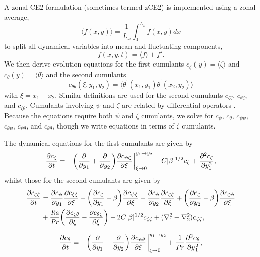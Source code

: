 \documentclass{jfm}
\newcommand{\cz}{c_{\zeta}}
\newcommand{\cs}{c_{\psi}}
\newcommand{\ct}{c_{\theta}}
\newcommand{\css}{c_{\psi \psi}}
\newcommand{\csz}{c_{\psi \zeta}}
\newcommand{\czs}{c_{\zeta \psi}}
\newcommand{\czz}{c_{\zeta \zeta}}
\newcommand{\ctz}{c_{\theta \zeta}}
\newcommand{\czt}{c_{\zeta \theta}}
\newcommand{\ctt}{c_{\theta \theta}}
\newcommand{\cst}{c_{\psi \theta}}
\newcommand{\cts}{c_{\theta \psi}}
\newcommand{\Rayleigh}{\mbox{\textit{Ra}}}  %
\begin{document}
A zonal CE2 formulation (sometimes termed zCE2) is implemented using a zonal average, 
\begin{equation}
\langle f(x,y) \rangle = \frac{1}{L_x} \int_0^{L_x} f(x,y) dx
\end{equation}
to split all dynamical variables into mean and fluctuating components,
\begin{equation}
    f(x,y,t) = \langle f \rangle + f'.
\end{equation}
We then derive evolution equations for the first cumulants $\cz(y) = \langle \zeta \rangle $ and $\ct(y) = \langle \theta \rangle$ and the second cumulants 
\begin{equation}
    \ctt(\xi,y_1,y_2) = \langle \theta^\prime(x_1,y_1) \theta^\prime(x_2,y_2) \rangle
\end{equation}
with $\xi = x_1 - x_2$.
Similar definitions are used for the second cumulants $\czz$, $\ctz$, and $\czt$. 
Cumulants involving $\psi$ and $\zeta$ are related by differential operators \citep{2013PhRvL.110j4502T}.
Because the equations require both $\psi$ and $\zeta$ cumulants, we solve for $\cs$, $\ct$, $\css$, $\cts$, $\cst$, and $\ctt$, though we write equations in terms of $\zeta$ cumulants.

The  dynamical equations for the first cumulants are given by
\begin{equation}
  \label{eq:cz}
  \pdv{\cz}{t} = - \qty(\pdv{y_1} + \pdv{y_2}) \pdv{\csz}{\xi}\eval_{\xi \to 0}^{y_1 \to y_2} - C |\beta|^{1/2} \cz + \pdv[2]{\cz}{y_1},
\end{equation}
whilst those for the second cumulants are given by
\begin{equation}
  \label{eq:czz}
  \begin{split}
    \pdv{\czz}{t} &= \pdv{\cs}{y_1} \pdv{\czz}{\xi} - \qty(\pdv{\cz}{y_1} - \beta) \pdv{\csz}{\xi} - \pdv{\cs}{y_2} \pdv{\czz}{\xi}  + \qty(\pdv{\cz}{y_2} - \beta) \pdv{\czs}{\xi}\\
    &+ \frac{\Rayleigh}{\Pran} \qty(\pdv{\czt}{\xi} -  \pdv{\ctz}{\xi}) - 2C |\beta|^{1/2} \czz + (\nabla_1^2 + \nabla_2^2) \czz,    
  \end{split}
\end{equation}

\begin{equation}
  \label{eq:ct}
  \pdv{\ct}{t} = - \qty(\pdv{y_1} + \pdv{y_2}) \pdv{\cst}{\xi} \eval_{\xi \to 0}^{y_1 \to y_2} + \frac{1}{\Pran} \pdv[2]{\ct}{y_1},
\end{equation}
\end{document}
